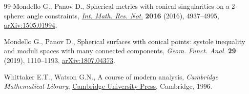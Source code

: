 \documentclass[10pt,a4paper]{amsart}
\providecommand{\LastPageEnding}{}
\numberwithin{equation}{section}
\begin{document}
\begin{thebibliography}{99}
Mondello G., Panov D., Spherical metrics with conical singularities on a
 2-sphere: angle constraints, \href{https://doi.org/10.1093/imrn/rnv300}{\textit{Int. Math. Res. Not.}} \textbf{2016}
 (2016), 4937--4995, \href{https://arxiv.org/abs/1505.01994}{arXiv:1505.01994}.

Mondello G., Panov D., Spherical surfaces with conical points: systole
 inequality and moduli spaces with many connected components, \href{https://doi.org/10.1007/s00039-019-00506-3}{\textit{Geom.
 Funct. Anal.}} \textbf{29} (2019), 1110--1193, \href{https://arxiv.org/abs/1807.04373}{arXiv:1807.04373}.

Whittaker E.T., Watson G.N., A course of modern analysis, \textit{Cambridge Mathematical Library}, \href{https://doi.org/10.1017/CBO9780511608759}{Cambridge University Press}, Cambridge, 1996.

\end{thebibliography}\LastPageEnding
\end{document}

